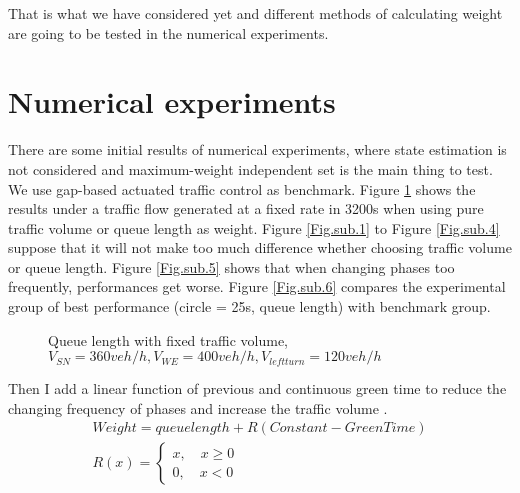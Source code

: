 \documentclass{article}
\begin{document}
That is what we have considered yet and different methods of calculating weight are going to be tested in the numerical experiments. 

\section{Numerical experiments}

There are some initial results of numerical experiments, where state estimation is not considered and maximum-weight independent set is the main thing to test.
We use gap-based actuated traffic control as benchmark. Figure \ref{Fig.main} shows the results under a traffic flow generated at a fixed rate in 3200s when using pure traffic volume or queue length as weight. Figure \ref{Fig.sub.1} to Figure \ref{Fig.sub.4} suppose that it will not make too much difference whether choosing traffic volume or queue length. Figure \ref{Fig.sub.5} shows that when changing phases too frequently, performances get worse. Figure \ref{Fig.sub.6} compares the experimental group of best performance (circle = 25s, queue length) with benchmark group.

\begin{figure}[htbp]

\centering  %




\caption{Queue length with fixed traffic volume, $V_{SN}= 360 veh/h, V_{WE} = 400 veh/h, V_{left turn}= 120 veh/h$}
\label{Fig.main}

\end{figure}


Then I add a linear function of previous and continuous green time to reduce the changing frequency of phases and increase the traffic volume
.
\begin{gather}
    Weight = queue length +R(Constant- GreenTime)\\
    R(x)= \begin{cases}
x,\quad x\geq 0 \\
0,\quad x<0
\end{cases} 
\end{gather}
\end{document}
